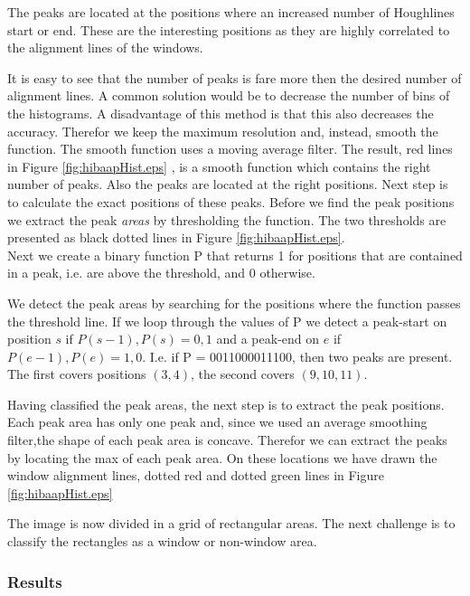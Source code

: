 The peaks are located at the positions where an increased number of Houghlines
start or end.  These are the interesting positions as they are highly correlated
to the alignment lines of the windows. 

It is easy to see that the number of peaks is fare more then the desired number of alignment lines.
A common solution would be to decrease the number of bins of the histograms. A
disadvantage of this method is that this also decreases the accuracy. Therefor
we keep the maximum resolution and, instead, smooth the function. The smooth
function uses a moving average filter.
The result, red lines in Figure \ref{fig:hibaapHist.eps}
, is a smooth function which contains the right number of peaks. Also the peaks
are located at the right positions. Next step is to calculate the exact positions of these peaks.
Before we find the peak positions we extract the peak \emph{areas} by thresholding the
function. The two thresholds are presented as black dotted lines in Figure \ref{fig:hibaapHist.eps}.\\
Next we create a binary function P that returns 1 for positions that are contained in
a peak, i.e. are above the threshold, and 0 otherwise.

We detect the peak areas by searching for the positions where the function
passes the threshold line. 
If we loop through the values of P we detect a peak-start on position $s$ if ${P(s-1),P(s)}={0,1}$
and a peak-end on $e$ if ${P(e-1),P(e)}={1,0}$. 
I.e. if P = 0011000011100, then two peaks are present. The first covers positions $(3,4)$, 
the second covers $(9,10,11)$. 

Having classified the peak areas, the next step is to extract the peak positions. 
Each peak area has only one peak and, since we used an average smoothing filter,the shape of each  
peak area is concave. Therefor we can extract the peaks
by locating the max of each peak area. 
On these locations we have drawn the window alignment lines, dotted red and dotted green lines
in Figure \ref{fig:hibaapHist.eps}

The image is now divided in a grid of rectangular areas. The next challenge is to 
classify the rectangles as a window or non-window area.


\subsubsection{Results}

